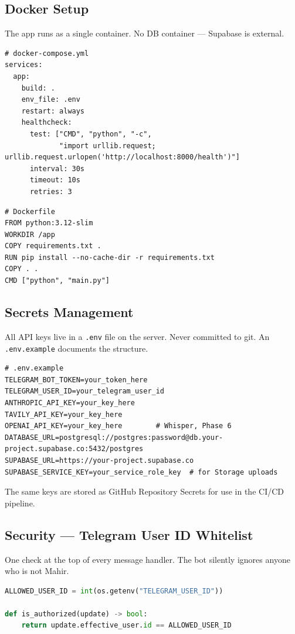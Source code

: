 \documentclass[12pt, a4paper]{article}
\begin{document}
\subsection{Docker Setup}

The app runs as a single container. No DB container --- Supabase is external.

\begin{lstlisting}
# docker-compose.yml
services:
  app:
    build: .
    env_file: .env
    restart: always
    healthcheck:
      test: ["CMD", "python", "-c",
             "import urllib.request; urllib.request.urlopen('http://localhost:8000/health')"]
      interval: 30s
      timeout: 10s
      retries: 3
\end{lstlisting}

\begin{lstlisting}
# Dockerfile
FROM python:3.12-slim
WORKDIR /app
COPY requirements.txt .
RUN pip install --no-cache-dir -r requirements.txt
COPY . .
CMD ["python", "main.py"]
\end{lstlisting}

\subsection{Secrets Management}

All API keys live in a \texttt{.env} file on the server. Never committed to git. An \texttt{.env.example} documents the structure.

\begin{lstlisting}
# .env.example
TELEGRAM_BOT_TOKEN=your_token_here
TELEGRAM_USER_ID=your_telegram_user_id
ANTHROPIC_API_KEY=your_key_here
TAVILY_API_KEY=your_key_here
OPENAI_API_KEY=your_key_here        # Whisper, Phase 6
DATABASE_URL=postgresql://postgres:password@db.your-project.supabase.co:5432/postgres
SUPABASE_URL=https://your-project.supabase.co
SUPABASE_SERVICE_KEY=your_service_role_key  # for Storage uploads
\end{lstlisting}

The same keys are stored as GitHub Repository Secrets for use in the CI/CD pipeline.

\subsection{Security --- Telegram User ID Whitelist}

One check at the top of every message handler. The bot silently ignores anyone who is not Mahir.

\begin{lstlisting}[language=Python]
ALLOWED_USER_ID = int(os.getenv("TELEGRAM_USER_ID"))

def is_authorized(update) -> bool:
    return update.effective_user.id == ALLOWED_USER_ID
\end{lstlisting}
\end{document}
